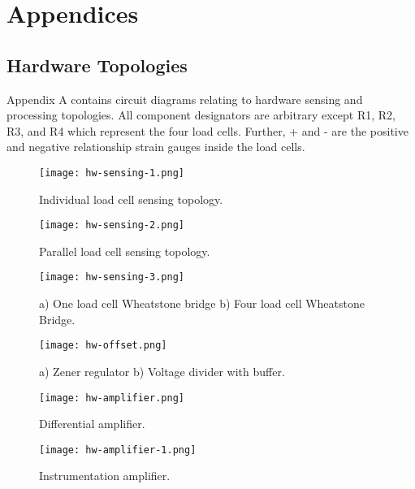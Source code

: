
\part{Appendices}

\chapter{Hardware Topologies}

Appendix A contains circuit diagrams relating to hardware sensing and processing topologies. All component designators are arbitrary except R1, R2, R3, and R4 which represent the four load cells. Further, + and - are the positive and negative relationship strain gauges inside the load cells.

\begin{figure}[!ht]
	\centering
	\texttt{[image: hw-sensing-1.png]}
	\caption{Individual load cell sensing topology.}
	\label{fig:sense-1}
\end{figure}

\begin{figure}[!ht]
	\centering
	\texttt{[image: hw-sensing-2.png]}
	\caption{Parallel load cell sensing topology.}
	\label{fig:sense-2}
\end{figure}

\begin{figure}[!ht]
	\centering
	\texttt{[image: hw-sensing-3.png]}
	\caption{a) One load cell Wheatstone bridge b) Four load cell Wheatstone Bridge.}
	\label{fig:sense-3}
\end{figure}

\begin{figure}[!ht]
	\centering
	\texttt{[image: hw-offset.png]}
	\caption{a) Zener regulator b) Voltage divider with buffer.}
	\label{fig:offset}
\end{figure}

\begin{figure}[!ht]
	\centering
	\texttt{[image: hw-amplifier.png]}
	\caption{Differential amplifier.}
	\label{fig:amplifier}
\end{figure}

\begin{figure}[!ht]
	\centering
	\texttt{[image: hw-amplifier-1.png]}
	\caption{Instrumentation amplifier.}
	\label{fig:amplifier-2}
\end{figure}

